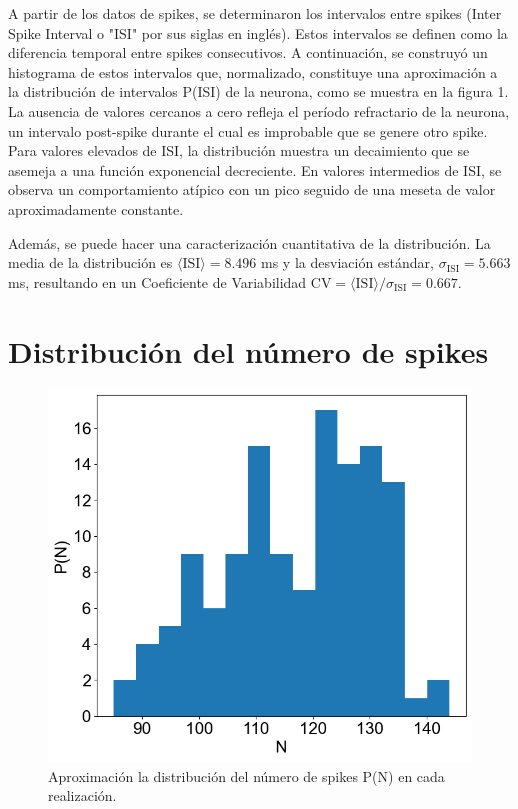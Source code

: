 \documentclass[aps,prb,twocolumn,superscriptaddress,floatfix,longbibliography]{revtex4-2}
\begin{document}
A partir de los datos de spikes, se determinaron los intervalos entre spikes (Inter Spike Interval o "ISI" por sus siglas en inglés). Estos intervalos se definen como la diferencia temporal entre spikes consecutivos. A continuación, se construyó un histograma de estos intervalos que, normalizado, constituye una aproximación a la distribución de intervalos P(ISI) de la neurona, como se muestra en la figura 1. La ausencia de valores cercanos a cero refleja el período refractario de la neurona, un intervalo post-spike durante el cual es improbable que se genere otro spike. Para valores elevados de ISI, la distribución muestra un decaimiento que se asemeja a una función exponencial decreciente. En valores intermedios de ISI, se observa un comportamiento atípico con un pico seguido de una meseta de valor aproximadamente constante.

Además, se puede hacer una caracterización cuantitativa de la distribución. La media de la distribución es $\langle \mathrm{ISI} \rangle = 8.496$ ms y la desviación estándar, $\sigma_{\mathrm{ISI}} = 5.663$ ms, resultando en un Coeficiente de Variabilidad $\mathrm{CV} = \langle \mathrm{ISI} \rangle / \sigma_{\mathrm{ISI}} =  0.667$.

\section{Distribución del número de spikes}

\begin{figure}[h]
  \includegraphics[clip=true,width=0.8\columnwidth]{N_histogram.png}
  \caption{Aproximación la distribución del número de spikes P(N) en cada realización.}
   \label{fig:N_histogram}
\end{figure}
\end{document}
